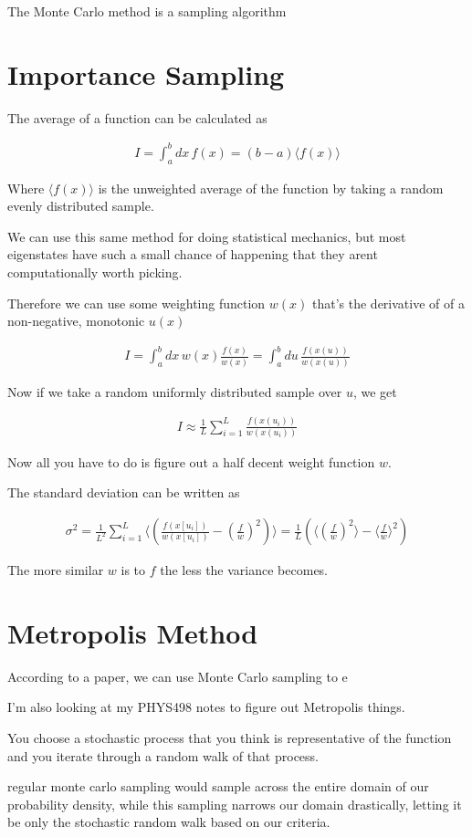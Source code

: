 \documentclass[fleqn]{report}
\newcommand{\equations} [1] {
\begin{gather*}
#1
\end{gather*}
}
\begin{document}
The Monte Carlo method is a sampling algorithm 

\section{Importance Sampling}
The average of a function can be calculated as 
\equations{
    I = \int^b_a dx \, f(x)
    =
    (b - a) \langle f(x) \rangle
}
Where $ \langle f(x) \rangle$ is the unweighted average of the function 
by taking a random evenly distributed sample. 

We can use this same method for doing statistical mechanics, but most 
eigenstates have such a small chance of happening that they arent computationally 
worth picking. 

Therefore we can use some weighting function $w(x)$ that's the derivative 
of of a non-negative, monotonic $u(x)$
\equations{
    I 
    =
    \int^b_a dx \, w(x) \frac{f(x)}{w(x)}
    =
    \int^b_a du \, \frac{f(x(u))}{w(x(u))}
}

Now if we take a random uniformly distributed sample over $u$, we get 
\equations{
    I 
    \approx 
    \frac{1}{L}
    \sum^{L}_{i = 1} \frac{f(x(u_i))}{w(x(u_i))}
}

Now all you have to do is figure out a half decent weight function $w$.

The standard deviation can be written as 
\equations{
    \sigma^2 
    =
    \frac{1}{L^2}
    \sum^L_{i=1}
    \langle
        \left(
            \frac{f(x[u_i])}{w(x[u_i])}
            -
            (\frac{f}{w})^2
        \right)
    \rangle
    =
    \frac{1}{L}
    \left(
        \langle
            (\frac{f}{w})^2
        \rangle
        -
        \langle
            \frac{f}{w}
        \rangle^2
    \right)
}
The more similar $w$ is to $f$ the less the variance becomes.

\section{Metropolis Method}
According to a paper, we can use Monte Carlo sampling to e

I'm also looking at my PHYS498 notes to figure out Metropolis things. 

You choose a stochastic process that you think is representative of the 
function and you iterate through a random walk of that process. 

regular monte carlo sampling would sample across the entire domain of 
our probability density, while this sampling narrows our domain drastically, 
letting it be only the stochastic random walk based on our criteria. 
\end{document}

